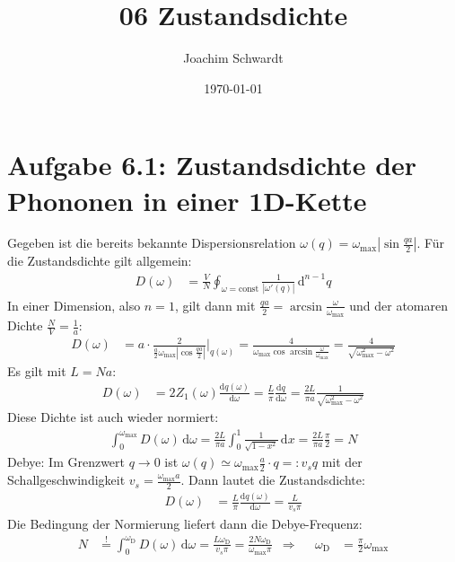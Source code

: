 \documentclass[a4paper,12pt]{article}
\newcommand{\intx}{}
\newcommand{\intr}{}
\newcommand{\tecxt}{}
\begin{document}
\title{06 Zustandsdichte}
\author{Joachim Schwardt}
\date{\today}
\maketitle

\section*{Aufgabe 6.1: Zustandsdichte der Phononen in einer 1D-Kette}
Gegeben ist die bereits bekannte Dispersionsrelation $\omega(q)=\omega_\tecxt\text{max}\left\vert\sin\frac{qa}{2}\right\vert$. Für die Zustandsdichte gilt allgemein:
\begin{align*}
D(\omega)&=\frac{V}{N}\intr\oint_{\omega=\tecxt\text{const}}\frac{1}{|\omega'(q)|}\,\mathrm{d}^{n-1}q
\end{align*} 
In einer Dimension, also $n=1$, gilt dann mit $\frac{qa}{2}=\arcsin\frac{\omega}{\omega_\tecxt\text{max}}$ und der atomaren Dichte $\frac{N}{V}=\frac{1}{a}$:
\begin{align*}
D(\omega)&=a\cdot\frac{2}{\frac{a}{2}\omega_\tecxt\text{max}\left\vert\cos\frac{qa}{2}\right\vert}\Big\vert_{q(\omega)}=\frac{4}{\omega_\tecxt\text{max}\cos\arcsin\frac{\omega}{\omega_\tecxt\text{max}}}=\frac{4}{\sqrt{\omega_\tecxt\text{max}^2-\omega^2}}
\end{align*}
Es gilt mit $L=Na$:
\begin{align*}
D(\omega)&=2Z_1(\omega)\frac{\tecxt\text{d}q(\omega)}{\tecxt\text{d}\omega}=\frac{L}{\pi}\frac{\tecxt\text{d}q}{\tecxt\text{d}\omega}=\frac{2L}{\pi a}\frac{1}{\sqrt{\omega_\tecxt\text{max}^2-\omega^2}}
\end{align*}
Diese Dichte ist auch wieder normiert:
\begin{align*}
\intx\int_{0}^{\omega_\tecxt\text{max}}D(\omega)\,\mathrm{d}\omega = \frac{2L}{\pi a}\intx\int_{0}^{1}\frac{1}{\sqrt{1-x^2}}\,\mathrm{d}x=\frac{2L}{\pi a}\frac{\pi}{2}=N
\end{align*}
Debye: Im Grenzwert $q\rightarrow 0$ ist $\omega(q)\simeq \omega_\tecxt\text{max}\frac{a}{2}\cdot q=:v_sq$ mit der Schallgeschwindigkeit $v_s=\frac{\omega_\tecxt\text{max}a}{2}$. Dann lautet die Zustandsdichte:
\begin{align*}
D(\omega)&=\frac{L}{\pi}\frac{\tecxt\text{d}q(\omega)}{\tecxt\text{d}\omega}=\frac{L}{v_s\pi}
\end{align*}
Die Bedingung der Normierung liefert dann die Debye-Frequenz:
\begin{align*}
N&\overset{!}{=}\intx\int_{0}^{\omega_\tecxt\text{D}}D(\omega)\,\mathrm{d}\omega = \frac{L\omega_\tecxt\text{D}}{v_s\pi}=\frac{2N\omega_\tecxt\text{D}}{\omega_\tecxt\text{max}\pi}&\Rightarrow &&\omega_\tecxt\text{D}&=\frac{\pi}{2}\omega_\tecxt\text{max}
\end{align*}
\end{document}
